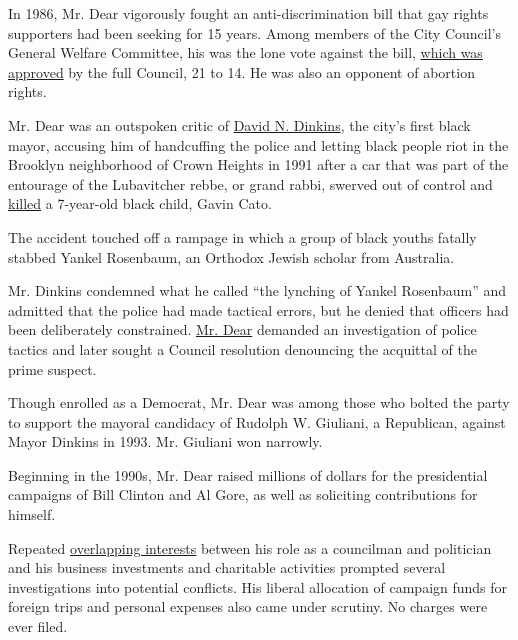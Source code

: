 In 1986, Mr. Dear vigorously fought an anti-discrimination bill that gay
rights supporters had been seeking for 15 years. Among members of the
City Council's General Welfare Committee, his was the lone vote against
the bill,
\href{https://www.nytimes.com/1986/03/21/nyregion/homosexual-rights-bill-is-passed-by-city-council-in-21-to-14-vote.html}{which
was approved} by the full Council, 21 to 14. He was also an opponent of
abortion rights.

Mr. Dear was an outspoken critic of
\href{https://www.nytimes.com/2017/11/10/nyregion/david-dinkins-doesnt-think-he-failed-he-might-be-right.html}{David
N. Dinkins}, the city's first black mayor, accusing him of handcuffing
the police and letting black people riot in the Brooklyn neighborhood of
Crown Heights in 1991 after a car that was part of the entourage of the
Lubavitcher rebbe, or grand rabbi, swerved out of control and
\href{https://www.nytimes.com/1996/08/15/nyregion/the-case-that-rocked-crown-heights.html}{killed}
a 7-year-old black child, Gavin Cato.

The accident touched off a rampage in which a group of black youths
fatally stabbed Yankel Rosenbaum, an Orthodox Jewish scholar from
Australia.

Mr. Dinkins condemned what he called ``the lynching of Yankel
Rosenbaum'' and admitted that the police had made tactical errors, but
he denied that officers had been deliberately constrained.
\href{https://www.nytimes.com/1992/11/14/nyregion/dinkins-issues-appeal-on-crown-heights-debate.html}{Mr.
Dear} demanded an investigation of police tactics and later sought a
Council resolution denouncing the acquittal of the prime suspect.

Though enrolled as a Democrat, Mr. Dear was among those who bolted the
party to support the mayoral candidacy of Rudolph W. Giuliani, a
Republican, against Mayor Dinkins in 1993. Mr. Giuliani won narrowly.

Beginning in the 1990s, Mr. Dear raised millions of dollars for the
presidential campaigns of Bill Clinton and Al Gore, as well as
soliciting contributions for himself.

Repeated
\href{https://www.nytimes.com/1991/05/22/nyregion/noach-dear-master-of-overlapping-interests.html}{overlapping
interests} between his role as a councilman and politician and his
business investments and charitable activities prompted several
investigations into potential conflicts. His liberal allocation of
campaign funds for foreign trips and personal expenses also came under
scrutiny. No charges were ever filed.

